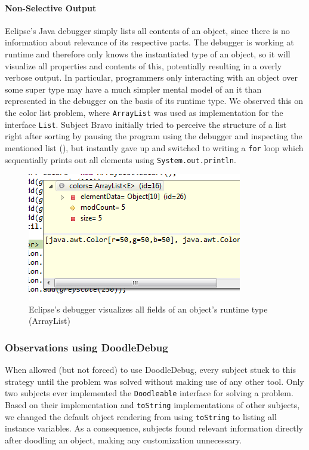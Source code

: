 \documentclass[english]{scrartcl}
\newcommand{\DD}{Dood\-le\-De\-bug\xspace}
\newcommand{\println}{\texttt{Sys\-tem.\-out.\-println}\xspace}
\begin{document}
\paragraph{Non-Selective Output}
Eclipse's Java debugger simply lists all contents of an object, since there is no information about relevance of its respective parts.
The debugger is working at runtime and therefore only knows the instantiated type of an object, so it will visualize all properties and contents of this, potentially resulting in a overly verbose output.
In particular, programmers only interacting with an object over some super type may have a much simpler mental model of an it than represented in the debugger on the basis of its runtime type.
We observed this on the color list problem, where \texttt{ArrayList}
was used as implementation for the interface \texttt{List}.
Subject Bravo initially tried to perceive the structure of a list right after sorting by pausing the program  using the debugger and inspecting the mentioned list (), but instantly gave up and switched to writing a \texttt{for} loop which sequentially prints out all elements using \println.

\begin{figure}[h]
	\includegraphics[width=\linewidth]{img/debugger_color-list_remo.png}
	\caption[Bravo using the debugger for a color list]{Eclipse's debugger visualizes all fields of an object's runtime type (ArrayList)}
\end{figure}

\subsubsection{Observations using \DD}
When allowed (but not forced) to use \DD, every subject stuck to this strategy until the problem was solved without making use of any other tool.
Only two subjects ever implemented the \texttt{Doodleable} interface for solving a problem.
Based on their implementation and \texttt{toString} implementations of other subjects, we changed the default object rendering from using \texttt{toString} to listing all instance variables.
As a consequence, subjects found relevant information directly after doodling an object, making any customization unnecessary.
\end{document}
